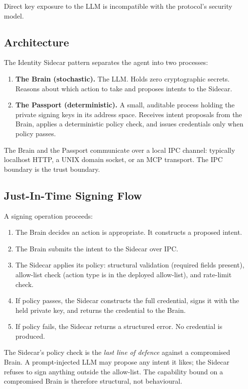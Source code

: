 \documentclass[11pt,a4paper,twocolumn]{article}
\begin{document}
Direct key exposure to the LLM is incompatible with the protocol's security model.

\subsection{Architecture}

The Identity Sidecar pattern separates the agent into two processes:

\begin{enumerate}[label=\arabic*.,leftmargin=*]
\item \textbf{The Brain (stochastic).} The LLM. Holds zero cryptographic secrets. Reasons about which action to take and proposes intents to the Sidecar.
\item \textbf{The Passport (deterministic).} A small, auditable process holding the private signing keys in its address space. Receives intent proposals from the Brain, applies a deterministic policy check, and issues credentials only when policy passes.
\end{enumerate}

The Brain and the Passport communicate over a local IPC channel: typically localhost HTTP, a UNIX domain socket, or an MCP transport. The IPC boundary is the trust boundary.

\subsection{Just-In-Time Signing Flow}

A signing operation proceeds:

\begin{enumerate}[label=\arabic*.,leftmargin=*]
\item The Brain decides an action is appropriate. It constructs a proposed intent.
\item The Brain submits the intent to the Sidecar over IPC.
\item The Sidecar applies its policy: structural validation (required fields present), allow-list check (action type is in the deployed allow-list), and rate-limit check.
\item If policy passes, the Sidecar constructs the full credential, signs it with the held private key, and returns the credential to the Brain.
\item If policy fails, the Sidecar returns a structured error. No credential is produced.
\end{enumerate}

The Sidecar's policy check is the \emph{last line of defence} against a compromised Brain. A prompt-injected LLM may propose any intent it likes; the Sidecar refuses to sign anything outside the allow-list. The capability bound on a compromised Brain is therefore structural, not behavioural.
\end{document}
